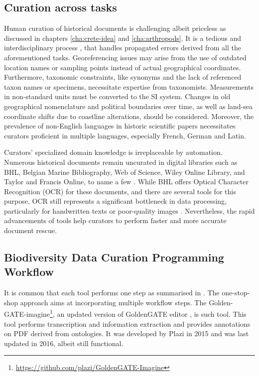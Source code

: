 \subsection{Curation across tasks}

Human curation of historical documents is challenging albeit priceless as discussed 
in chapters \ref{cha:crete-idea} and \ref{cha:arthropods}.
It is a tedious and interdisciplinary process \parencite{faulwetter_emodnet_2016,beja_chapter_2022},
that handles propagated errors derived from all the aforementioned tasks.
Georeferencing issues may arise from the use of outdated location names or sampling
points instead of actual geographical coordinates. Furthermore, taxonomic constraints, like synonyms and the lack of referenced taxon names or specimens,
necessitate expertise from taxonomists. Measurements in non-standard units must be
converted to the SI system. Changes in old geographical nomenclature and
political boundaries over time, as well as land-sea coordinate shifts due
to coastline alterations, should be considered. Moreover, the prevalence of
non-English languages in historic scientific papers necessitates curators proficient in multiple languages, 
especially French, German and Latin.

Curators' specialized domain knowledge is irreplaceable by automation.
Numerous historical documents remain uncurated in digital libraries such as BHL,
Belgian Marine Bibliography, Web of Science, Wiley Online Library, and Taylor and
Francis Online, to name a few \parencite{kearney_its_2019}. While BHL offers Optical
Character Recognition (OCR) for these documents, and there are several tools for
this purpose, OCR still represents a significant bottleneck in data processing,
particularly for handwritten texts or poor-quality images \parencite{lyal_digitising_2016}.
Nevertheless, the rapid advancements of tools help curators to perform faster and
more accurate document rescue.


\subsection{Biodiversity Data Curation Programming Workflow}

It is common that each tool performs one step as summarised in \parencite{Paragkamian2022, beja_chapter_2022}.
The one-stop-shop approach aims at incorporating multiple workflow steps. 
The Golden-GATE-imagine\footnote{\url{https://github.com/plazi/GoldenGATE-Imagine}}, an updated
version of GoldenGATE editor \parencite{sautter_semi-automated_2007}, is such tool. This tool
performs transcription and information extraction and provides annotations on PDF derived from ontologies. It
was developed by Plazi in 2015 and was last updated in 2016, albeit still functional.

